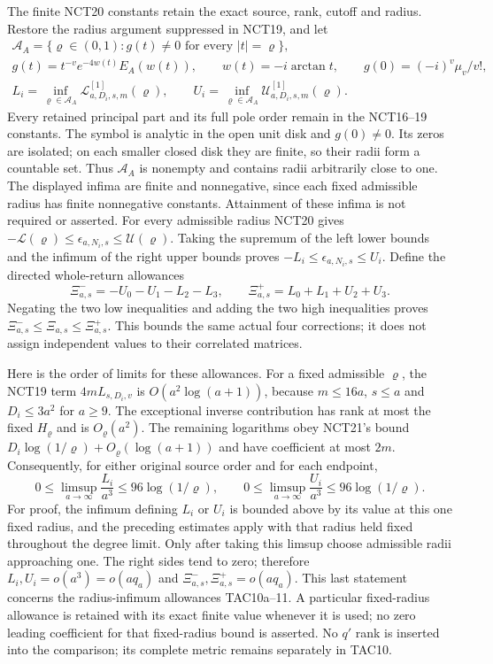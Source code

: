 The finite NCT20 constants retain the exact source, rank, cutoff and
radius. Restore the radius argument suppressed in NCT19, and let
\[
\begin{gathered}
 \mathcal A_A=\{\varrho\in(0,1):g(t)\ne0\text{ for every }|t|=\varrho\},\\
 g(t)=t^{-v}e^{-4w(t)}E_A(w(t)),\qquad w(t)=-i\arctan t,\qquad
 g(0)=(-i)^v\mu_v/v!,\\
 L_i=\inf_{\varrho\in\mathcal A_A}
          \mathcal L_{a,D_i,s,m}^{[1]}(\varrho),\qquad
 U_i=\inf_{\varrho\in\mathcal A_A}
          \mathcal U_{a,D_i,s,m}^{[1]}(\varrho).
\end{gathered}\tag{TAC10a}
\]
Every retained principal part and its full pole order remain in the
NCT16--19 constants. The symbol is analytic in the open unit disk and
$g(0)\ne0$. Its zeros are isolated; on each smaller closed disk they
are finite, so their radii form a countable set. Thus $\mathcal A_A$
is nonempty and contains radii arbitrarily close to one. The displayed
infima are finite and nonnegative, since each fixed admissible radius
has finite nonnegative constants. Attainment of these infima is not
required or asserted. For every admissible radius NCT20 gives
$-\mathcal L(\varrho)\le\epsilon_{a,N_i,s}\le\mathcal U(\varrho)$.
Taking the supremum of the left lower bounds and the infimum of the
right upper bounds proves $-L_i\le\epsilon_{a,N_i,s}\le U_i$.
Define the directed whole-return allowances
\[
 \Xi^-_{a,s}=-U_0-U_1-L_2-L_3,
 \qquad \Xi^+_{a,s}=L_0+L_1+U_2+U_3.
 \tag{TAC11}
\]
Negating the two low inequalities and adding the two high inequalities
proves $\Xi^-_{a,s}\le\Xi_{a,s}\le\Xi^+_{a,s}$. This bounds the
same actual four corrections; it does not assign independent values to
their correlated matrices.

Here is the order of limits for these allowances. For a fixed admissible
$\varrho$, the NCT19 term $4mL_{s,D_i,v}$ is
$O(a^2\log(a+1))$, because $m\le16a$, $s\le a$ and
$D_i\le3a^2$ for $a\ge9$. The exceptional inverse contribution has
rank at most the fixed $H_\varrho$ and is $O_\varrho(a^2)$.
The remaining logarithms obey NCT21's bound
$D_i\log(1/\varrho)+O_\varrho(\log(a+1))$ and have coefficient
at most $2m$. Consequently, for either original source order and
for each endpoint,
\[
 0\le\limsup_{a\to\infty}\frac{L_i}{a^3}
       \le96\log(1/\varrho),\qquad
 0\le\limsup_{a\to\infty}\frac{U_i}{a^3}
       \le96\log(1/\varrho).
 \tag{TAC11a}
\]
For proof, the infimum defining $L_i$ or $U_i$ is bounded above by its
value at this one fixed radius, and the preceding estimates apply with
that radius held fixed throughout the degree limit. Only after taking
this limsup choose admissible radii approaching one. The right sides
tend to zero; therefore $L_i,U_i=o(a^3)=o(aq_a)$ and
$\Xi^-_{a,s},\Xi^+_{a,s}=o(aq_a)$. This last statement concerns the
radius-infimum allowances TAC10a--11. A particular fixed-radius
allowance is retained with its exact finite value whenever it is used;
no zero leading coefficient for that fixed-radius bound is asserted.
No $q'$ rank is inserted into the comparison; its complete metric
remains separately in TAC10.

